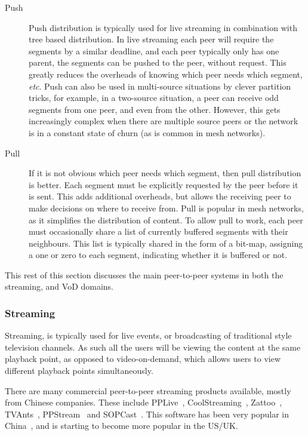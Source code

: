 \begin{description}
  \item[Push] Push distribution is typically used for live streaming in combination with tree based distribution. In live streaming each peer will require the segments by a similar deadline, and each peer typically only has one parent, the segments can be pushed to the peer, without request. This greatly reduces the overheads of knowing which peer needs which segment, \emph{etc}. Push can also be used in multi-source situations by clever partition tricks, for example, in a two-source situation, a peer can receive odd segments from one peer, and even from the other. However, this gets increasingly complex when there are multiple source peers or the network is in a constant state of churn (as is common in mesh networks).

  \item[Pull] If it is not obvious which peer needs which segment, then pull distribution is better. Each segment must be explicitly requested by the peer before it is sent. This adds additional overheads, but allows the receiving peer to make decisions on where to receive from. Pull is popular in mesh networks, as it simplifies the distribution of content. To allow pull to work, each peer must occasionally share a list of currently buffered segments with their neighbours. This list is typically shared in the form of a bit-map, assigning a one or zero to each segment, indicating whether it is buffered or not.

\end{description}

    This rest of this section discusses the main peer-to-peer systems in both the streaming, and VoD domains.

\subsubsection{Streaming}

    Streaming, is typically used for live events, or broadcasting of traditional style television channels. As such all the users will be viewing the content at the same playback point, as opposed to video-on-demand, which allows users to view different playback points simultaneously.

    There are many commercial peer-to-peer streaming products available, mostly from Chinese companies. These include PPLive~\cite{pplive}, CoolStreaming~\cite{zhang2005cdd}, Zattoo~\cite{zattoo}, TVAnts~\cite{tvants}, PPStream~\cite{ppstream} and SOPCast~\cite{sopcast}. This software has been very popular in China~\cite{fowler2005nef}, and is starting to become more popular in the US/UK.

